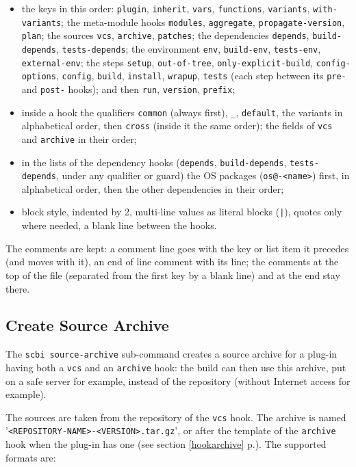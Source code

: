 \documentclass[a4paper,12pt,twoside]{article}
\newcommand{\code}[1]{\texttt{#1}}
\newcommand{\seeref}[1]{see section \ref{#1} p.\pageref{#1}}
\newcommand{\file}[1]{'{\texttt{#1}}'}
\begin{document}
\begin{itemize}
	\item the keys in this order: \code{plugin}, \code{inherit},
	\code{vars}, \code{functions}, \code{variants}, \code{with-variants};
	the meta-module hooks \code{modules}, \code{aggregate},
	\code{propagate-version}, \code{plan};
	the sources \code{vcs}, \code{archive}, \code{patches}; the
	dependencies \code{depends}, \code{build-depends},
	\code{tests-depends}; the environment \code{env}, \code{build-env},
	\code{tests-env}, \code{external-env}; the steps \code{setup},
	\code{out-of-tree}, \code{only-explicit-build}, \code{config-options},
	\code{config}, \code{build}, \code{install}, \code{wrapup},
	\code{tests} (each step between its \code{pre-} and \code{post-}
	hooks); and then \code{run}, \code{version}, \code{prefix};
	\item inside a hook the qualifiers \code{common} (always first),
	\code{\_}, \code{default}, the variants in alphabetical order, then
	\code{cross} (inside it the same order);
	the fields of \code{vcs} and \code{archive} in their order;
	\item in the lists of the dependency hooks (\code{depends},
	\code{build-depends}, \code{tests-depends}, under any qualifier or
	guard) the OS packages (\code{os@-<name>}) first, in alphabetical
	order, then the other dependencies in their order;
	\item block style, indented by 2, multi-line values as literal blocks
	(\code{|}), quotes only where needed, a blank line between the hooks.
\end{itemize}

The comments are kept: a comment line goes with the key or list item it
precedes (and moves with it), an end of line comment with its line; the
comments at the top of the file (separated from the first key by a blank
line) and at the end stay there.

\subsection{Create Source Archive}
\label{createsourcearchive}

The \code{scbi source-archive} sub-command creates a source archive for a plug-in having both a \code{vcs} and an \code{archive} hook: the build can then use this archive, put on a safe server for example, instead of the repository (without Internet access for example).

The sources are taken from the repository of the \code{vcs} hook. The archive is named \file{<REPOSITORY-NAME>-<VERSION>.tar.gz}, or after the template of the \code{archive} hook when the plug-in has one (\seeref{hookarchive}). The supported formats are:
\end{document}
